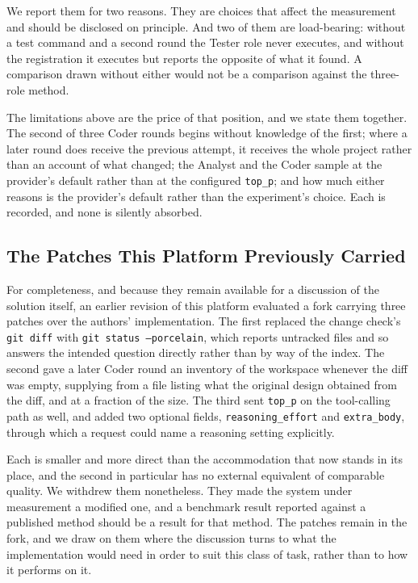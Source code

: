 We report them for two reasons. They are choices that affect the measurement
and should be disclosed on principle. And two of them are load-bearing: without
a test command and a second round the Tester role never executes, and without
the registration it executes but reports the opposite of what it found. A
comparison drawn without either would not be a comparison against the
three-role method.

The limitations above are the price of that position, and we state them
together. The second of three Coder rounds begins without knowledge of the
first; where a later round does receive the previous attempt, it receives the
whole project rather than an account of what changed; the Analyst and the Coder
sample at the provider's default rather than at the configured \texttt{top\_p};
and how much either reasons is the provider's default rather than the
experiment's choice. Each is recorded, and none is silently absorbed.

\subsection{The Patches This Platform Previously Carried}
\label{sec:selfcollab-patches}

For completeness, and because they remain available for a discussion of the
solution itself, an earlier revision of this platform evaluated a fork carrying
three patches over the authors' implementation. The first replaced the change
check's \texttt{git diff} with \texttt{git status --porcelain}, which reports
untracked files and so answers the intended question directly rather than by
way of the index. The second gave a later Coder round an inventory of the
workspace whenever the diff was empty, supplying from a file listing what the
original design obtained from the diff, and at a fraction of the size. The
third sent \texttt{top\_p} on the tool-calling path as well, and added two
optional fields, \texttt{reasoning\_effort} and \texttt{extra\_body}, through
which a request could name a reasoning setting explicitly.

Each is smaller and more direct than the accommodation that now stands in its
place, and the second in particular has no external equivalent of comparable
quality. We withdrew them nonetheless. They made the system under measurement a
modified one, and a benchmark result reported against a published method should
be a result for that method. The patches remain in the fork, and we draw on
them where the discussion turns to what the implementation would need in order
to suit this class of task, rather than to how it performs on it.

